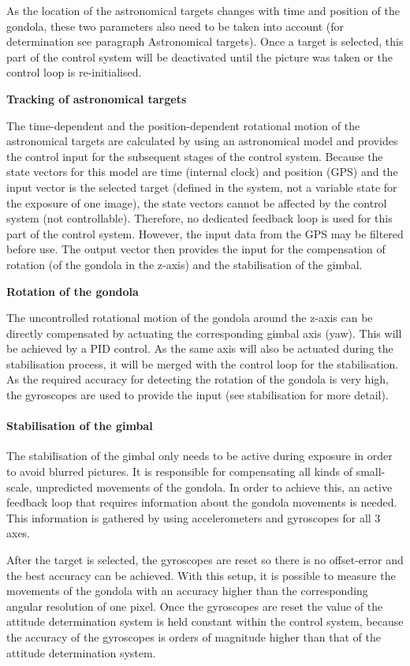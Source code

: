 As the location of the astronomical targets changes with time and position of the gondola, these two parameters also need to be taken into account (for determination see paragraph Astronomical targets). Once a target is selected, this part of the control system will be deactivated until the picture was taken or the control loop is re-initialised.


\textbf{Tracking of astronomical targets}

The time-dependent and the position-dependent rotational motion of the astronomical targets are calculated by using an astronomical model and provides the control input for the subsequent stages of the control system. Because the state vectors for this model are time (internal clock) and position (GPS) and the input vector is the selected target (defined in the system, not a variable state for the exposure of one image), the state vectors cannot be affected by the control system (not controllable). Therefore, no dedicated feedback loop is used for this part of the control system. However, the input data from the GPS may be filtered before use. The output vector then provides the input for the compensation of rotation (of the gondola in the z-axis) and the stabilisation of the gimbal.

\textbf{Rotation of the gondola}

The uncontrolled rotational motion of the gondola around the z-axis can be directly compensated by actuating the corresponding gimbal axis (yaw). This will be achieved by a PID control. As the same axis will also be actuated during the stabilisation process, it will be merged with the control loop for the stabilisation. As the required accuracy for detecting the rotation of the gondola is very high, the gyroscopes are used to provide the input (see stabilisation for more detail).


\paragraph{Stabilisation of the gimbal}
The stabilisation of the gimbal only needs to be active during exposure in order to avoid blurred pictures. It is responsible for compensating all kinds of small-scale, unpredicted movements of the gondola. In order to achieve this, an active feedback loop that requires information about the gondola movements is needed. This information is gathered by using accelerometers and gyroscopes for all 3 axes.

After the target is selected, the gyroscopes are reset so there is no offset-error and the best accuracy can be achieved. With this setup, it is possible to measure the movements of the gondola with an accuracy higher than the corresponding angular resolution of one pixel. Once the gyroscopes are reset the value of the attitude determination system is held constant within the control system, because the accuracy of the gyroscopes is orders of magnitude higher than that of the attitude determination system. 


